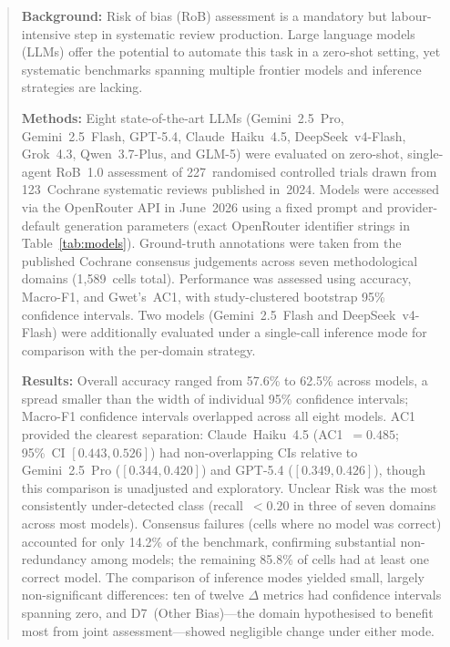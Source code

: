 \documentclass[12pt,a4paper]{article}
\begin{document}
\begin{abstract}
\noindent\textbf{Background:}
Risk of bias (RoB) assessment is a mandatory but labour-intensive step in
systematic review production.
Large language models (LLMs) offer the potential to automate this task in a
zero-shot setting, yet systematic benchmarks spanning multiple frontier models
and inference strategies are lacking.

\noindent\textbf{Methods:}
Eight state-of-the-art LLMs (Gemini~2.5~Pro, Gemini~2.5~Flash, GPT-5.4,
Claude~Haiku~4.5, DeepSeek~v4-Flash, Grok~4.3, Qwen~3.7-Plus, and GLM-5)
were evaluated on zero-shot, single-agent RoB~1.0 assessment of 227~randomised
controlled trials drawn from 123~Cochrane systematic reviews published in~2024.
Models were accessed via the OpenRouter API in June~2026 using a fixed prompt
and provider-default generation parameters (exact OpenRouter identifier strings
in Table~\ref{tab:models}).
Ground-truth annotations were taken from the published Cochrane consensus
judgements across seven methodological domains (1{,}589~cells total).
Performance was assessed using accuracy, Macro-F1, and Gwet's~AC1, with
study-clustered bootstrap 95\% confidence intervals.
Two models (Gemini~2.5~Flash and DeepSeek~v4-Flash) were additionally
evaluated under a single-call inference mode for comparison with the
per-domain strategy.

\noindent\textbf{Results:}
Overall accuracy ranged from 57.6\% to 62.5\% across models, a spread
smaller than the width of individual 95\% confidence intervals;
Macro-F1 confidence intervals overlapped across all eight models.
AC1 provided the clearest separation: Claude~Haiku~4.5
(AC1~$= 0.485$; 95\%~CI $[0.443, 0.526]$) had non-overlapping CIs relative to
Gemini~2.5~Pro ($[0.344, 0.420]$) and GPT-5.4 ($[0.349, 0.426]$),
though this comparison is unadjusted and exploratory.
Unclear Risk was the most consistently under-detected class
(recall~$< 0.20$ in three of seven domains across most models).
Consensus failures (cells where no model was correct) accounted for only
14.2\% of the benchmark, confirming substantial non-redundancy among models;
the remaining 85.8\% of cells had at least one correct model.
The comparison of inference modes yielded small, largely non-significant
differences: ten of twelve $\Delta$ metrics had confidence intervals
spanning zero, and D7~(Other Bias)---the domain hypothesised to benefit
most from joint assessment---showed negligible change under either mode.


\end{abstract}
\end{document}
